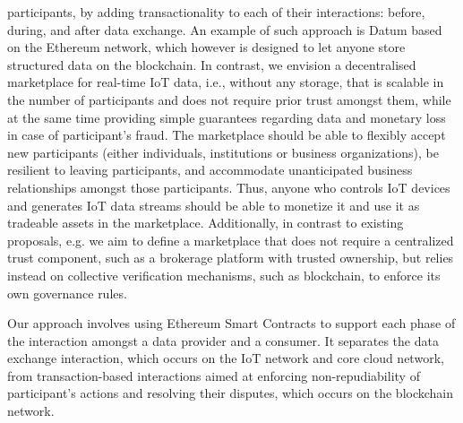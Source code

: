 \documentclass[12pt]{article}
\begin{document}
participants, by adding transactionality to each of their interactions: before, during, and after data exchange. An example
of such approach is Datum  based on
the Ethereum network, which however is designed to let
anyone store structured data on the blockchain. In contrast,
we envision a decentralised marketplace for real-time IoT
data, i.e., without any storage, that is scalable in the number
of participants and does not require prior trust amongst them,
while at the same time providing simple guarantees regarding
data and monetary loss in case of participant’s fraud. The
marketplace should be able to flexibly accept new participants (either individuals, institutions or business organizations), be resilient to leaving participants, and accommodate
unanticipated business relationships amongst those participants. Thus, anyone who controls IoT devices and generates
IoT data streams should be able to monetize it and use it as
tradeable assets in the marketplace. Additionally, in contrast
to existing proposals, e.g. we aim to define a marketplace
that does not require a centralized trust component, such as a
brokerage platform with trusted ownership, but relies instead
on collective verification mechanisms, such as blockchain, to
enforce its own governance rules.\par
Our approach involves using Ethereum Smart Contracts
to support each phase of the interaction amongst a data
provider and a consumer. It separates the data exchange
interaction, which occurs on the IoT network and core
cloud network, from transaction-based interactions aimed
at enforcing non-repudiability of participant’s actions and
resolving their disputes, which occurs on the blockchain
network.






















\newpage  
\end{document}

